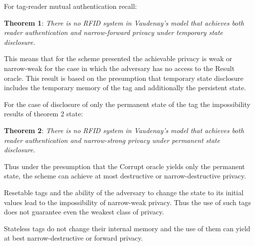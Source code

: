     For tag-reader mutual authentication recall:

    \textbf{Theorem 1}: \textit{There is no RFID system in Vaudenay's model that achieves both reader authentication and narrow-forward privacy 
    under temporary state disclosure.}

    This means that for the scheme presented the achievable privacy is weak or narrow-weak for the case in which the adversary has no
    access to the Result oracle. This result is based on the presumption that temporary state disclosure includes the temporary
    memory of the tag and additionally the persistent state.

    For the case of disclosure of only the permanent state of the tag the impossibility results of theorem 2 state:

    \textbf{Theorem 2}: \textit{There is no RFID system in Vaudenay's model that achieves both reader authentication and narrow-strong privacy 
    under permanent state disclosure.}

    Thus under the presumption that the Corrupt oracle yields only the permanent state, the scheme can achieve at most destructive or
    narrow-destructive privacy.

    Resetable tags and the ability of the adversary to change the state to its initial values lead to the impossibility of narrow-weak
    privacy. Thus the use of such tags does not guarantee even the weakest class of privacy.

    Stateless tags do not change their internal memory and the use of them can yield at best narrow-destructive or forward privacy.
